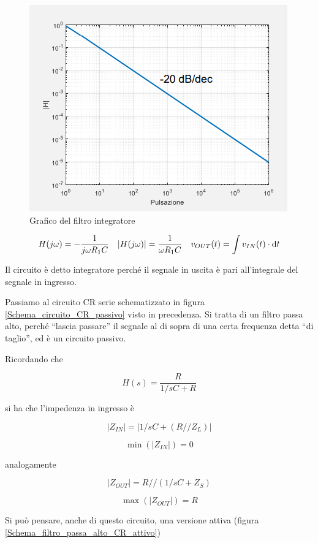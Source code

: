 \documentclass{article}
\begin{document}
\begin{figure}[h]
  \centering
  \includegraphics[scale=0.6]{IM_filtro_integratore_grafici}
  \caption{Grafico del filtro integratore}
  \label{Schema_filtro_integratore_grafici}
\end{figure}

\[H(j \omega) = - \frac{1}{j \omega R_1 C} \quad |H(j \omega)| = \frac{1}{\omega R_1 C} \quad v_{OUT} (t) = \int v_{IN} (t) \cdot \textrm d t\]

Il circuito è detto integratore perché il segnale in uscita è pari all'integrale del segnale in ingresso.

\clearpage
Passiamo al circuito CR serie schematizzato in figura \ref{Schema_circuito_CR_passivo} visto in precedenza. Si tratta di un filtro passa alto, perché ``lascia passare'' il segnale al di sopra di una certa frequenza detta ``di taglio'', ed è un circuito passivo.

\vspace{3mm}

Ricordando che

\[H(s) = \frac{R}{1/sC + R}\]

si ha che l'impedenza in ingresso è

\[|Z_{IN}|=|1/sC + (R // Z_L)|\]

\[\min(|Z_{IN}|) = 0\]

analogamente

\[|Z_{OUT}|= R // (1/sC + Z_S)\]

\[\max(|Z_{OUT}|) = R\]

Si può pensare, anche di questo circuito, una versione attiva (figura \ref{Schema_filtro_passa_alto_CR_attivo})
\end{document}
